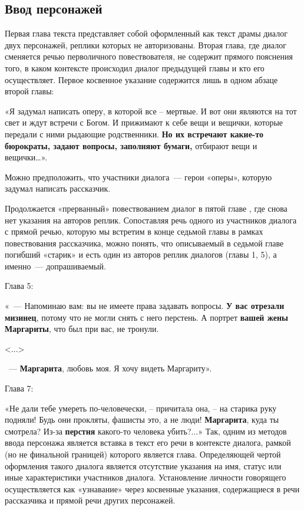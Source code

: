 \documentclass{kursa4}
\begin{document}
{      \subsection{Ввод персонажей}

        Первая глава текста    представляет собой    оформленный как текст драмы  диалог двух персонажей, реплики которых не авторизованы.   Вторая глава,   где диалог сменяется речью перволичного повествователя, не содержит прямого пояснения того, в каком контексте происходил диалог предыдущей главы и кто его осуществляет.    Первое  косвенное  указание содержится   лишь  в одном абзаце второй главы:  

        «Я задумал написать оперу, в которой все – мертвые. И вот они
        являются на тот свет и ждут встречи с Богом. И прижимают к себе вещи и
        вещички, которые передали с ними рыдающие родственники. \textbf{Но их
        встречают какие-то бюрократы, задают вопросы, заполняют бумаги,}
        отбирают вещи и вещички…».

        Можно предположить, что участники диалога~--- герои «оперы», которую
        задумал написать рассказчик. 

        Продолжается «прерванный» повествованием диалог в пятой главе , где
        снова нет указания на авторов реплик. Сопоставляя речь одного из
        участников диалога с прямой речью, которую мы встретим в конце седьмой
        главы в рамках повествования рассказчика, можно понять, что описываемый
        в седьмой главе погибший «старик» и есть один из авторов реплик
        диалогов (главы 1, 5), а именно~--- допрашиваемый. 

        Глава 5:

        «~--- Напоминаю вам: вы не имеете права задавать вопросы. \textbf{У вас
        отрезали мизинец}, потому что не могли снять с него перстень. А портрет
        \textbf{вашей жены }\textbf{Маргариты}, что был при вас, не тронули.

        \textless{}...\textgreater{}

        ~--- \textbf{Маргарита}, любовь моя. Я хочу видеть Маргариту».

        Глава 7:

        «Не дали тебе умереть по-человечески, – причитала она, – на старика
        руку подняли! Будь они прокляты, фашисты это, а не люди!
        \textbf{Маргарита}, куда ты смотрела? Из-за \textbf{перстня} какого-то
        человека убить?...»
        Так, одним из методов ввода персонажа является вставка в текст его
        речи в контексте диалога, рамкой (но не финальной границей) которого
        является глава. Определяющей чертой оформления такого диалога является
        отсутствие указания на имя, статус или иные характеристики участников
        диалога. Установление личности говорящего осуществляется как
        «узнавание» через косвенные указания, содержащиеся в речи рассказчика
        и прямой речи других персонажей. 

}
\end{document}
